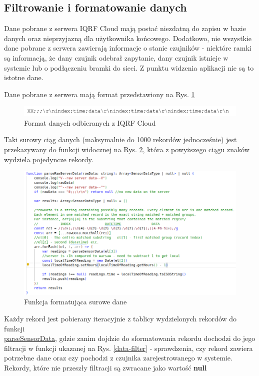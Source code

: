 \subsection{Filtrowanie i formatowanie danych}
Dane pobrane z serwera IQRF Cloud mają postać niezdatną do zapisu w bazie danych oraz nieprzyjazną dla użytkownika końcowego. Dodatkowo, nie wszystkie dane pobrane z 
serwera zawierają informacje o stanie czujników - niektóre ramki są informacją, że dany czujnik odebrał zapytanie, dany czujnik istnieje w systemie lub o podłączeniu
bramki do sieci. Z punktu widzenia aplikacji nie są to istotne dane.

Dane pobrane z serwera mają format przedstawiony na Rys. \ref{data-format}

\begin{figure}[H]
    \includegraphics[width=\textwidth]{zdj/app/data-shape-iqrf.png}
    \caption{Format danych odbieranych z IQRF Cloud \cite{iqrfcloud-guide}}
    \label{data-format}
\end{figure}

Taki surowy ciąg danych (maksymalnie do 1000 rekordów jednocześnie) jest przekazywany do funkcji widocznej na Rys. \ref{data-formatter}, która z powyższego ciągu znaków
wydziela pojedyncze rekordy.

\begin{figure}[H]
    \includegraphics[width=\textwidth]{zdj/app/parse-raw.png}
    \caption{Funkcja formatująca surowe dane}
    \label{data-formatter}
\end{figure}

Każdy rekord jest pobierany iteracyjnie z tablicy wydzielonych rekordów do funkcji \\ \underline{parseSensorData}, gdzie zanim dojdzie do sformatowania rekordu 
dochodzi do jego filtracji w funkcji ukazanej na Rys. \ref{data-filter} - sprawdzenia, czy rekord zawiera potrzebne dane oraz czy pochodzi z czujnika zarejestrowanego w systemie. Rekordy, które nie przeszły filtracji 
są zwracane jako wartość \textbf{null}

